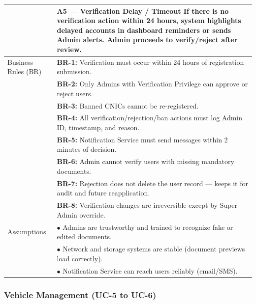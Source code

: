 \begin{longtable}{|>{\raggedright\arraybackslash}p{4cm}|>{\raggedright\arraybackslash}p{11cm}|}
& \textbf{A5 — Verification Delay / Timeout} \newline If there is no verification action within 24 hours, system highlights delayed accounts in dashboard reminders or sends Admin alerts. Admin proceeds to verify/reject after review. \\
\hline
Business Rules (BR) & \textbf{BR-1:} Verification must occur within 24 hours of registration submission. \\
& \textbf{BR-2:} Only Admins with Verification Privilege can approve or reject users. \\
& \textbf{BR-3:} Banned CNICs cannot be re-registered. \\
& \textbf{BR-4:} All verification/rejection/ban actions must log Admin ID, timestamp, and reason. \\
& \textbf{BR-5:} Notification Service must send messages within 2 minutes of decision. \\
& \textbf{BR-6:} Admin cannot verify users with missing mandatory documents. \\
& \textbf{BR-7:} Rejection does not delete the user record — keeps it for audit and future reapplication. \\
& \textbf{BR-8:} Verification changes are irreversible except by Super Admin override. \\
\hline
Assumptions & $\bullet$ Admins are trustworthy and trained to recognize fake or edited documents. \\
& $\bullet$ Network and storage systems are stable (document previews load correctly). \\
& $\bullet$ Notification Service can reach users reliably (email/SMS). \\
\end{longtable}

\subsubsection{Vehicle Management (UC-5 to UC-6)}

